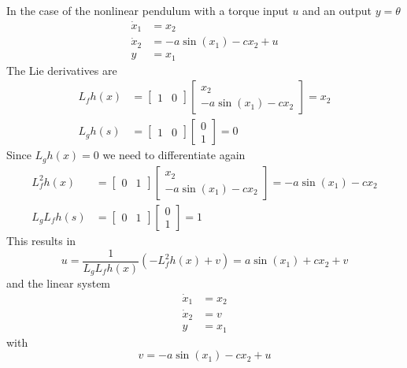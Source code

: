 \begin{examplesection}[Pendulum]
    In the case of the nonlinear pendulum with a torque input $u$ and an output $y=\theta$
    \begin{align*}
        \dot{x}_1 & = x_2                    \\
        \dot{x}_2 & = -a \sin(x_1)-c x_2 + u \\
        y         & = x_1
    \end{align*}
    The Lie derivatives are
    \begin{align*}
        L_f h(x) & = \begin{bmatrix}
                         1 & 0
                     \end{bmatrix}
        \begin{bmatrix}
            x_2 \\
            -a \sin(x_1) -cx_2
        \end{bmatrix} = x_2
        \\
        L_g h(s) & = \begin{bmatrix}
                         1 & 0
                     \end{bmatrix}
        \begin{bmatrix}
            0 \\
            1
        \end{bmatrix} = 0
    \end{align*}
    Since $L_g h(x) = 0$ we need to differentiate again
    \begin{align*}
        L_f^2 h(x)   & = \begin{bmatrix}
                             0 & 1
                         \end{bmatrix}
        \begin{bmatrix}
            x_2 \\
            -a \sin(x_1) -cx_2
        \end{bmatrix} = -a \sin(x_1) -c x_2
        \\
        L_g L_f h(s) & = \begin{bmatrix}
                             0 & 1
                         \end{bmatrix}
        \begin{bmatrix}
            0 \\
            1
        \end{bmatrix} = 1
    \end{align*}
    This results in
    \begin{equation*}
        u = \frac{1}{L_g L_f h(x)}(-L_f^2 h(x) + v) = a \sin(x_1) + c x_2 + v
    \end{equation*}
    and the linear system
    \begin{align*}
        \dot{x}_1 & = x_2 \\
        \dot{x}_2 & = v   \\
        y         & = x_1
    \end{align*}
    with
    \begin{equation*}
        v = -a \sin(x_1)-c x_2 + u
    \end{equation*}
\end{examplesection}

